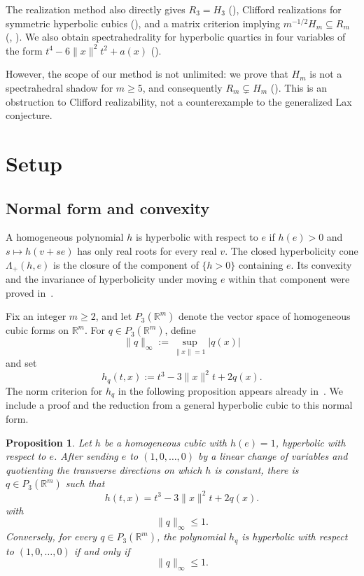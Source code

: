 \documentclass[11pt,onecolumn]{article}
\theoremstyle{blueplain}
\newtheorem{proposition}[proposition]{Proposition}
\theoremstyle{bluedefinition}
\theoremstyle{bluedefinition}
\newcommand{\R}{\mathbb R}
\begin{document}
The realization method also directly gives $R_3=H_3$ (), Clifford realizations for
symmetric hyperbolic cubics (), and a matrix criterion implying
$m^{-1/2}H_m\subseteq R_m$ (, ). We also obtain spectrahedrality for hyperbolic quartics in four variables of the form
$t^4-6\|x\|^2t^2+a(x)$ ().

However, the scope of our method is not unlimited: we prove that $H_m$ is not a spectrahedral
shadow for $m\geqslant5$, and consequently $R_m\subsetneq H_m$
().  This is an obstruction to Clifford realizability,
not a counterexample to the generalized Lax conjecture.

\section{Setup}

\subsection{Normal form and convexity}
A homogeneous polynomial $h$ is hyperbolic with respect to $e$
if $h(e)>0$ and $s\mapsto h(v+se)$ has only real roots for every real $v$.
The closed hyperbolicity cone $\Lambda_+(h,e)$ is the closure of the
component of $\{h>0\}$ containing $e$.  Its convexity and the invariance of
hyperbolicity under moving $e$ within that component were proved
in~\cite{Garding}.

Fix an integer $m\geqslant2$, and let $P_3(\R^m)$ denote the vector space of
homogeneous cubic forms on $\R^m$.  For $q\in P_3(\R^m)$, define
\[
\|q\|_\infty:=\sup_{\|x\|=1}|q(x)|
\] and set
\[
h_q(t,x):=t^3-3\|x\|^2t+2q(x).
\]
The norm criterion for $h_q$ in the following proposition appears already 
in~\cite{Saunderson}.
We include a proof and the reduction from a general hyperbolic cubic to this normal form.

\begin{proposition}\label{p:normal}
Let $h$ be a homogeneous cubic with $h(e)=1$, hyperbolic with respect to $e$.
After sending $e$ to $(1,0,\ldots,0)$ by a linear change of variables and
quotienting the transverse directions on which $h$ is constant, there is
$q\in P_3(\R^m)$ such that
\begin{equation*}
h(t,x)=t^3-3\|x\|^2t+2q(x).
\end{equation*}
with
\[
\|q\|_\infty\leqslant1.
\]
Conversely, for every $q\in P_3(\R^m)$, the polynomial $h_q$ is
hyperbolic with respect to $(1,0,\ldots,0)$ if and only if
\[
\|q\|_\infty\leqslant1.
\]
\end{proposition}
\end{document}
